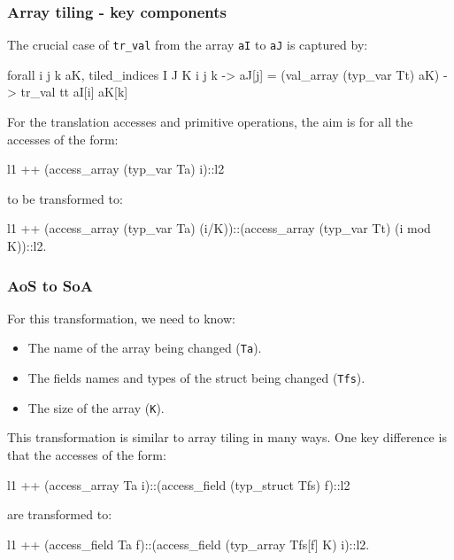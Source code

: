 \begin{frame}[fragile]
\frametitle{Array tiling - key components}



The crucial case of \texttt{tr\_val} from the array \texttt{aI} to \texttt{aJ} is captured by:

\begin{coqs}
  forall i j k aK,			tiled_indices I J K i j k ->
				  aJ[j] = (val_array (typ_var Tt) aK) ->
				  tr_val tt aI[i] aK[k]
\end{coqs}

\bigskip \pause

For the translation accesses and primitive operations, the aim is for all the accesses of the form:

\begin{coqs}
  l1 ++ (access_array (typ_var Ta) i)::l2
\end{coqs}

to be transformed to:

\begin{coqs}
  l1 ++ (access_array (typ_var Ta) (i/K))::(access_array (typ_var Tt) (i mod K))::l2.
\end{coqs}

\end{frame}


\begin{frame}[fragile]
\frametitle{AoS to SoA}

For this transformation, we need to know:
\begin{itemize}
	\item The name of the array being changed (\texttt{Ta}).
	\item The fields names and types of the struct being changed (\texttt{Tfs}).
	\item The size of the array (\texttt{K}).
\end{itemize}

\bigskip \pause

This transformation is similar to array tiling in many ways. One key difference is that the accesses
of the form:

\begin{coqs}
  l1 ++ (access_array Ta i)::(access_field (typ_struct Tfs) f)::l2
\end{coqs}

are transformed to:

\begin{coqs}
  l1 ++ (access_field Ta f)::(access_field (typ_array Tfs[f] K) i)::l2.
\end{coqs}

\end{frame}


